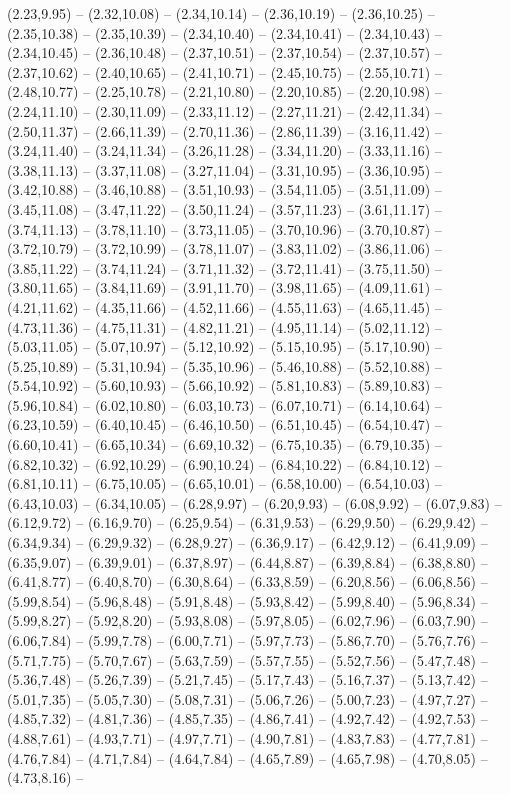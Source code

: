 \expandafter\def\csname geo:gebiet:DE-NI\endcsname{
  (2.23,9.95) -- (2.32,10.08) -- (2.34,10.14) -- (2.36,10.19) -- (2.36,10.25) -- (2.35,10.38) -- (2.35,10.39) -- (2.34,10.40) -- (2.34,10.41) -- (2.34,10.43) -- (2.34,10.45) -- (2.36,10.48) -- (2.37,10.51) -- (2.37,10.54) -- (2.37,10.57) -- (2.37,10.62) -- (2.40,10.65) -- (2.41,10.71) -- (2.45,10.75) -- (2.55,10.71) -- (2.48,10.77) -- (2.25,10.78) -- (2.21,10.80) -- (2.20,10.85) -- (2.20,10.98) -- (2.24,11.10) -- (2.30,11.09) -- (2.33,11.12) -- (2.27,11.21) -- (2.42,11.34) -- (2.50,11.37) -- (2.66,11.39) -- (2.70,11.36) -- (2.86,11.39) -- (3.16,11.42) -- (3.24,11.40) -- (3.24,11.34) -- (3.26,11.28) -- (3.34,11.20) -- (3.33,11.16) -- (3.38,11.13) -- (3.37,11.08) -- (3.27,11.04) -- (3.31,10.95) -- (3.36,10.95) -- (3.42,10.88) -- (3.46,10.88) -- (3.51,10.93) -- (3.54,11.05) -- (3.51,11.09) -- (3.45,11.08) -- (3.47,11.22) -- (3.50,11.24) -- (3.57,11.23) -- (3.61,11.17) -- (3.74,11.13) -- (3.78,11.10) -- (3.73,11.05) -- (3.70,10.96) -- (3.70,10.87) -- (3.72,10.79) -- (3.72,10.99) -- (3.78,11.07) -- (3.83,11.02) -- (3.86,11.06) -- (3.85,11.22) -- (3.74,11.24) -- (3.71,11.32) -- (3.72,11.41) -- (3.75,11.50) -- (3.80,11.65) -- (3.84,11.69) -- (3.91,11.70) -- (3.98,11.65) -- (4.09,11.61) -- (4.21,11.62) -- (4.35,11.66) -- (4.52,11.66) -- (4.55,11.63) -- (4.65,11.45) -- (4.73,11.36) -- (4.75,11.31) -- (4.82,11.21) -- (4.95,11.14) -- (5.02,11.12) -- (5.03,11.05) -- (5.07,10.97) -- (5.12,10.92) -- (5.15,10.95) -- (5.17,10.90) -- (5.25,10.89) -- (5.31,10.94) -- (5.35,10.96) -- (5.46,10.88) -- (5.52,10.88) -- (5.54,10.92) -- (5.60,10.93) -- (5.66,10.92) -- (5.81,10.83) -- (5.89,10.83) -- (5.96,10.84) -- (6.02,10.80) -- (6.03,10.73) -- (6.07,10.71) -- (6.14,10.64) -- (6.23,10.59) -- (6.40,10.45) -- (6.46,10.50) -- (6.51,10.45) -- (6.54,10.47) -- (6.60,10.41) -- (6.65,10.34) -- (6.69,10.32) -- (6.75,10.35) -- (6.79,10.35) -- (6.82,10.32) -- (6.92,10.29) -- (6.90,10.24) -- (6.84,10.22) -- (6.84,10.12) -- (6.81,10.11) -- (6.75,10.05) -- (6.65,10.01) -- (6.58,10.00) -- (6.54,10.03) -- (6.43,10.03) -- (6.34,10.05) -- (6.28,9.97) -- (6.20,9.93) -- (6.08,9.92) -- (6.07,9.83) -- (6.12,9.72) -- (6.16,9.70) -- (6.25,9.54) -- (6.31,9.53) -- (6.29,9.50) -- (6.29,9.42) -- (6.34,9.34) -- (6.29,9.32) -- (6.28,9.27) -- (6.36,9.17) -- (6.42,9.12) -- (6.41,9.09) -- (6.35,9.07) -- (6.39,9.01) -- (6.37,8.97) -- (6.44,8.87) -- (6.39,8.84) -- (6.38,8.80) -- (6.41,8.77) -- (6.40,8.70) -- (6.30,8.64) -- (6.33,8.59) -- (6.20,8.56) -- (6.06,8.56) -- (5.99,8.54) -- (5.96,8.48) -- (5.91,8.48) -- (5.93,8.42) -- (5.99,8.40) -- (5.96,8.34) -- (5.99,8.27) -- (5.92,8.20) -- (5.93,8.08) -- (5.97,8.05) -- (6.02,7.96) -- (6.03,7.90) -- (6.06,7.84) -- (5.99,7.78) -- (6.00,7.71) -- (5.97,7.73) -- (5.86,7.70) -- (5.76,7.76) -- (5.71,7.75) -- (5.70,7.67) -- (5.63,7.59) -- (5.57,7.55) -- (5.52,7.56) -- (5.47,7.48) -- (5.36,7.48) -- (5.26,7.39) -- (5.21,7.45) -- (5.17,7.43) -- (5.16,7.37) -- (5.13,7.42) -- (5.01,7.35) -- (5.05,7.30) -- (5.08,7.31) -- (5.06,7.26) -- (5.00,7.23) -- (4.97,7.27) -- (4.85,7.32) -- (4.81,7.36) -- (4.85,7.35) -- (4.86,7.41) -- (4.92,7.42) -- (4.92,7.53) -- (4.88,7.61) -- (4.93,7.71) -- (4.97,7.71) -- (4.90,7.81) -- (4.83,7.83) -- (4.77,7.81) -- (4.76,7.84) -- (4.71,7.84) -- (4.64,7.84) -- (4.65,7.89) -- (4.65,7.98) -- (4.70,8.05) -- (4.73,8.16) -- }
